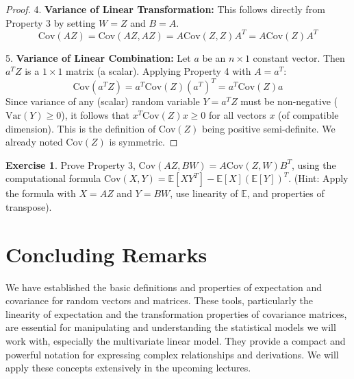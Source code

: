 \documentclass[11pt]{article}
\theoremstyle{definition}
\newtheorem{exercise}[theorem]{Exercise}
\newcommand{\E}{\mathbb{E}}
\newcommand{\Cov}{\mathrm{Cov}}
\newcommand{\Var}{\mathrm{Var}}
\begin{document}
\begin{proof}
4.  \textbf{Variance of Linear Transformation:} This follows directly from Property 3 by setting $W = Z$ and $B = A$.
    \[ \Cov(AZ) = \Cov(AZ, AZ) = A \Cov(Z, Z) A^T = A \Cov(Z) A^T \]

5.  \textbf{Variance of Linear Combination:} Let $a$ be an $n \times 1$ constant vector. Then $a^T Z$ is a $1 \times 1$ matrix (a scalar). Applying Property 4 with $A = a^T$:
    \[ \Cov(a^T Z) = a^T \Cov(Z) (a^T)^T = a^T \Cov(Z) a \]
    Since variance of any (scalar) random variable $Y = a^T Z$ must be non-negative ($\Var(Y) \ge 0$), it follows that $x^T \Cov(Z) x \ge 0$ for all vectors $x$ (of compatible dimension). This is the definition of $\Cov(Z)$ being positive semi-definite. We already noted $\Cov(Z)$ is symmetric.
\end{proof}

\begin{exercise}
Prove Property 3, $\Cov(A Z, B W) = A \Cov(Z, W) B^T$, using the computational formula $\Cov(X, Y) = \E[XY^T] - \E[X](\E[Y])^T$.
(Hint: Apply the formula with $X=AZ$ and $Y=BW$, use linearity of $\E$, and properties of transpose).
\end{exercise}

\section{Concluding Remarks}

We have established the basic definitions and properties of expectation and covariance for random vectors and matrices. These tools, particularly the linearity of expectation and the transformation properties of covariance matrices, are essential for manipulating and understanding the statistical models we will work with, especially the multivariate linear model. They provide a compact and powerful notation for expressing complex relationships and derivations. We will apply these concepts extensively in the upcoming lectures.
\end{document}
